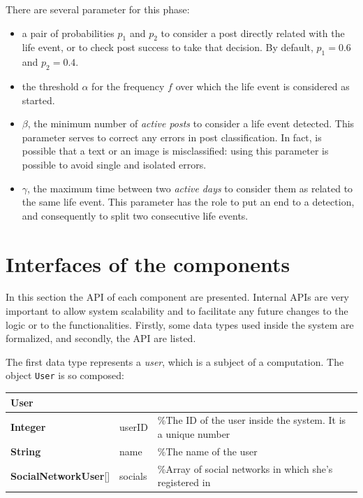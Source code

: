 There are several parameter for this phase: 
\begin{itemize}
\item a pair of probabilities $p_1$ and $p_2$ to consider a post directly related with the life event, or to check post success to take that decision. By default, $p_1 = 0.6$ and $p_2 = 0.4$.
\item the threshold $\alpha$ for the frequency $f$ over which the life event is considered as started.
\item $\beta$, the minimum number of \emph{active posts} to consider a life event detected. This parameter serves to correct any errors in post classification. In fact, is possible that a text or an image is misclassified: using this parameter is possible to avoid single and isolated errors.
\item $\gamma$, the maximum time between two \emph{active days} to consider them as related to the same life event. This parameter has the role to put an end to a detection, and consequently to split two consecutive life events.
\end{itemize}

\section{Interfaces of the components}
\label{sec:apis}
In this section the API of each component are presented. Internal APIs are very important to allow system scalability and to facilitate any future changes to the logic or to the functionalities. Firstly, some data types used inside the system are formalized, and secondly, the API are listed.

The first data type represents a \emph{user}, which is a subject of a computation. The object \texttt{User} is so composed:

\begin{center}
\label{tab:user}
\begin{tabular}{lll}
\hline
User & & \\
\hline
\textbf{Integer} & userID & \%The ID of the user inside the system. It is a unique number \\
\textbf{String} & name & \%The name of the user \\
\textbf{SocialNetworkUser}[] & socials & \%Array of social networks in which she's registered in \\
\hline
\end{tabular}
\end{center}

